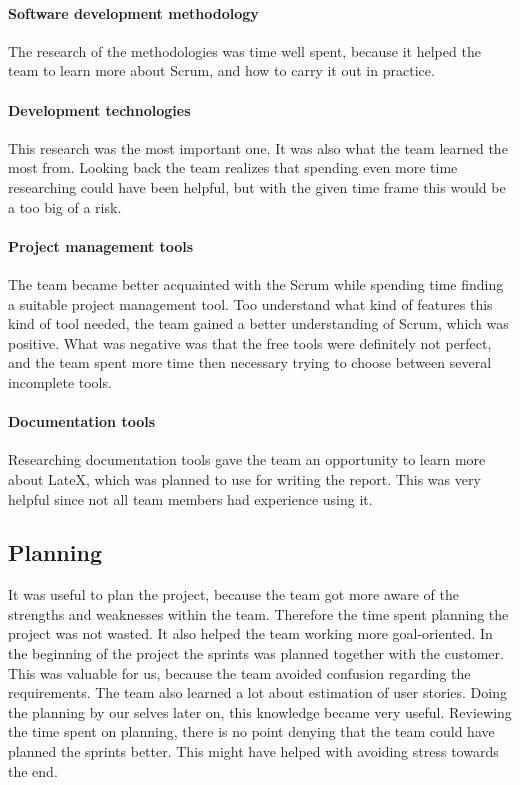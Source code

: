 \paragraph{Software development methodology}
The research of the methodologies was time well spent, because it helped the team to learn more about Scrum, and how to carry it out in practice.

\paragraph{Development technologies}
This research was the most important one. It was also what the team learned the most from. Looking back the team realizes that spending even more time researching could have been helpful, but with the given time frame this would be a too big of a risk.

\paragraph{Project management tools}
The team became better acquainted with the Scrum while spending time finding a suitable project management tool. Too understand what kind of features this kind of tool needed, the team gained a better understanding of Scrum, which was positive. What was negative was that the free tools were definitely not perfect, and the team spent more time then necessary trying to choose between several incomplete tools. 

\paragraph{Documentation tools}
Researching documentation tools gave the team an opportunity to learn more about LateX, which was planned to use for writing the report. This was very helpful since not all team members had experience using it. 

\subsection{Planning}

It was useful to plan the project, because the team got more aware of the strengths and weaknesses within the team. Therefore the time spent planning the project was not wasted. It also helped the team working more goal-oriented. In the beginning of the project the sprints was planned together with the customer. This was valuable for us, because the team avoided confusion regarding the requirements. The team also learned a lot about estimation of user stories. Doing the planning by our selves later on, this knowledge became very useful. Reviewing the time spent on planning, there is no point denying that the team could have planned the sprints better. This might have helped with avoiding stress towards the end.   

